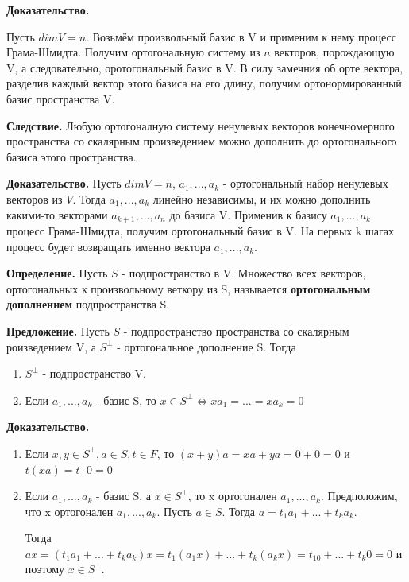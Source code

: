 \documentclass[a4paper]{article}
\begin{document}
\begin{hproof}
\textbf{Доказательство.}

Пусть $dimV = n$. Возьмём произвольный базис в V и применим к нему процесс Грама-Шмидта. Получим ортогональную систему из $n$ векторов, порождающую V, а следовательно, оротогональный базис в V. В силу замечния об орте вектора, разделив каждый вектор этого базиса на его длину, получим ортонормированный базис пространства V.
\end{hproof}

\begin{htheorem}
\textbf{Следствие.} Любую ортогоналную систему ненулевых векторов конечномерного пространства со скалярным произведением можно дополнить до ортогонального базиса этого пространства.
\end{htheorem}

\begin{hproof}
\textbf{Доказательство.} Пусть $dimV = n$, $a_1, ..., a_k$ - ортогональный набор ненулевых векторов из $V$. Тогда $a_1, ..., a_k$ линейно независимы, и их можно дополнить какими-то векторами $a_{k+1}, ..., a_n$ до базиса V. Применив к базису $a_1, ..., a_k$ процесс Грама-Шмидта, получим ортогональный базис в V. На первых k шагах процесс будет возвращать именно вектора $a_1, ..., a_k$.
\end{hproof}

\textbf{Определение.} Пусть $S$ - подпространство в V. Множество всех векторов, ортогональных к произвольному веткору из S, называется \textbf{ортогональным дополнением} подпространства S.

\begin{htheorem}
\textbf{Предложение.} Пусть $S$ - подпространство пространства со скалярным роизведением V, а $S^{\bot}$ - ортогональное дополнение S. Тогда 
\begin{enumerate}
\item $S^{\bot}$ - подпространство V.
\item Если $a_1, ..., a_k$ - базис S, то  $x \in S^{\bot} \Leftrightarrow xa_1 = ... = xa_k = 0$
\end{enumerate}
\end{htheorem}

\begin{hproof}
\textbf{Доказательство.}

\begin{enumerate}
\item Если $x, y \in S^{\bot}, a \in S, t \in F$, то $(x+y)a = xa+ya = 0+0=0$ и $t(xa) = t \cdot 0 = 0$

\item Если $a_1, ..., a_k$ - базис S, а $x \in S^{\bot}$, то x ортогонален $a_1, ..., a_k$. Предположим, что x ортогонален $a_1, ..., a_k$. Пусть $a \in S$. Тогда $a = t_1a_1 + ... +t_ka_k$.

Тогда $ax = (t_1a_1 + ... + t_ka_k)x = t_1(a_1x) + ... + t_k(a_kx) = t_10 + ... + t_k0 = 0$ и поэтому $x \in S^{\bot}$.
\end{enumerate}
\end{hproof}
\end{document}
